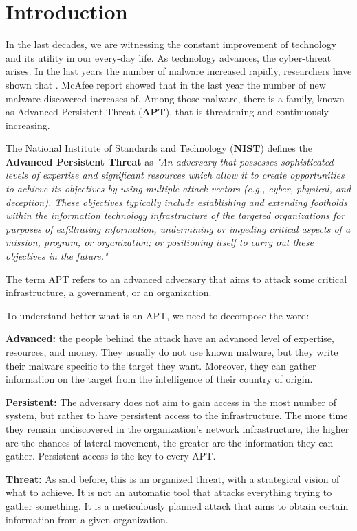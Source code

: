 \chapter{Introduction}

In the last decades, we are witnessing the constant improvement of technology and its utility in our every-day life. As technology advances, the cyber-threat arises.
In the last years the number of malware increased rapidly, researchers have shown that . McAfee report showed that in the last year the number of new malware discovered increases of. Among those malware, there is a family, known as Advanced Persistent Threat (\textbf{APT}), that is threatening and continuously increasing. 

The National Institute of Standards and Technology (\textbf{NIST}) defines the \textbf{Advanced Persistent Threat} as \textit{"An adversary that possesses sophisticated levels of expertise and significant resources which allow it to create opportunities to achieve its objectives by using multiple attack vectors (e.g., cyber, physical, and deception). These objectives typically include establishing and extending footholds within the information technology infrastructure of the targeted organizations for purposes of exfiltrating information, undermining or impeding critical aspects of a mission, program, or organization; or positioning itself to carry out these objectives in the future."}

The term APT refers to an advanced adversary that aims to attack some critical infrastructure, a government, or an organization. 

To understand better what is an APT, we need to decompose the word: \cite{apt_def}

\textbf{Advanced:} the people behind the attack have an advanced level of expertise, resources, and money. They usually do not use known malware, but they write their malware specific to the target they want. Moreover, they can gather information on the target from the intelligence of their country of origin.

\textbf{Persistent:}  The adversary does not aim to gain access in the most number of system, but rather to have persistent access to the infrastructure. The more time they remain undiscovered in the organization's network infrastructure, the higher are the chances of lateral movement, the greater are the information they can gather. Persistent access is the key to every APT.

\textbf{Threat:} As said before, this is an organized threat, with a strategical vision of what to achieve. It is not an automatic tool that attacks everything trying to gather something. It is a meticulously planned attack that aims to obtain certain information from a given organization. 

